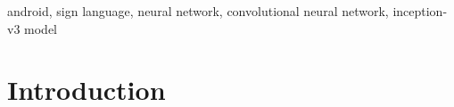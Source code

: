 \documentclass[journal]{./IEEE/IEEEtran}
\title{\SPTITLE}
\author{\ADVISEE~and~\ADVISER%
\REMARK
}
\begin{document}
\maketitle

\begin{abstract}
Sign language, although widely used by both the
deaf and hearing community, is still a challenge for
other people. SIGN ME UP is an Android application
which is designed to translate sign language even
offline. It uses a CNN for translating sign language to
text and a series of reference images for translating
text to sign language.
\newline
\indent Through retraining the Inception-v3 model, it
gained the highest and lowest confidence levels of
97.82\% and 27.11\% respectively, affected by similar
gestures. An average of 60.03\% confidence level was
obtained for all gestures while averages of 81.94\%
and 97.42\% for the top-1 and top-5 accuracies were
obtained.
\end{abstract}

\begin{keywords}
android, sign language, neural network, convolutional neural network, inception-v3 model
\end{keywords}

\section{Introduction}
\end{document}
